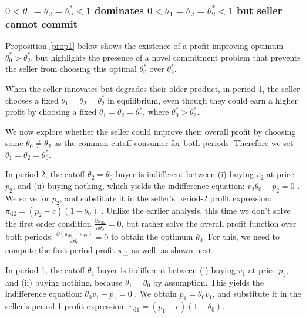 \documentclass[isre,blindrev]{informs3} %
\begin{document}
\subsubsection{\(0<\theta _1=\theta _2=\theta _0^*<1\) dominates \(0<\theta _1=\theta _2=\theta _2^*<1\) but seller cannot commit}
Proposition \ref{prop1} below shows the existence of a profit-improving optimum \(\theta _0^* > \theta _2^*\), but highlights the presence of a novel commitment problem that prevents the seller from choosing this optimal \(\theta _0^*\) over \(\theta _2^*\).
\begin{proposition}\label{prop1}
When the seller innovates but degrades their older product, in period 1, the seller chooses a fixed \(\theta _1=\theta _2=\theta
_2^*\) in equilibrium, even though they could earn a higher profit by choosing a fixed \(\theta _1=\theta _2=\theta _0^*\), where \(\theta _0^* > \theta _2^*\).
\end{proposition}

We now explore whether the seller could improve their overall profit by choosing some \(\theta _0\neq \theta _2\) as the common cutoff consumer for
both periods. Therefore we set \(\theta _1=\theta _2=\theta _0^*\).

In period 2, the cutoff \(\theta _2=\theta _0\) buyer is indifferent between (i) buying \(v_2\) at price \(p_2\), and (ii) buying nothing, which
yields the indifference equation: \(v_2 \theta _0-p_2 = 0\) . We solve for \(p_2\), and substitute it in the seller{'}s period-2 profit expression:
\(\pi _{\text{d2}}=\left(p_2-c\right)\left(1-\theta _0\right)\) . Unlike the earlier analysis, this time we don{'}t solve the first order condition
\(\frac{\partial \pi _{\text{d2}}}{\partial \theta _0}=0\), but rather solve the overall profit function over both periods: \(\frac{\partial \left(\pi
_{\text{d1}}+\pi _{\text{d2}}\right)}{\partial \theta _0}=0\) to obtain the optimum \(\theta _0\). For this, we need to compute the first period
profit \(\pi _{\text{d1}}\) as well, as shown next.

In period 1, the cutoff \(\theta _1\) buyer is indifferent between (i) buying \(v_1\) at price \(p_1\), and (ii) buying nothing, because \(\theta
_1=\theta _0\) by assumption. This { }yields the indifference equation: \(\theta _0v_1 - p_1 = 0\) . We obtain \(p_1=\theta _0v_1\), and substitute
it in the seller{'}s period-1 profit expression: \(\pi _{\text{d1}}=\left(p_1-c\right)\left(1-\theta _0\right)\).
\end{document}
